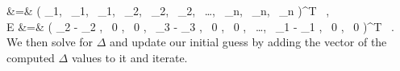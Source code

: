 	\Delta &=&
	 (
	  \Delta \ssp_1, \,
	  \Delta \zeit_1, \,
	  \Delta \gSpace_1, \,
	  \Delta \ssp_2, \,
	  \Delta \zeit_2, \,
	  \Delta \gSpace_2, \,
	  \ldots , \,
	  \Delta \ssp_n, \,
	  \Delta \zeit_n, \,
	  \Delta \gSpace_n
	 )^T \, ,
	 \\ 
	E &=&
	 (
	  \ssp_{2} - \matrixRep_2  , \,
	   0 	, \,
	   0 	, \,
	  \ssp_{3} - \matrixRep_3  , \,
	  0 	, \,
	  0 	, \,
	  \ldots , \,
	  \ssp_{1} - \matrixRep_1  , \,
	  0 	, \,
	  0 	
	  )^T \, . \label{eq:DeltaandE}	 
\eea
We then solve  for $\Delta$ and update our initial
guess by adding the vector of the computed $\Delta$ values to it and iterate.
